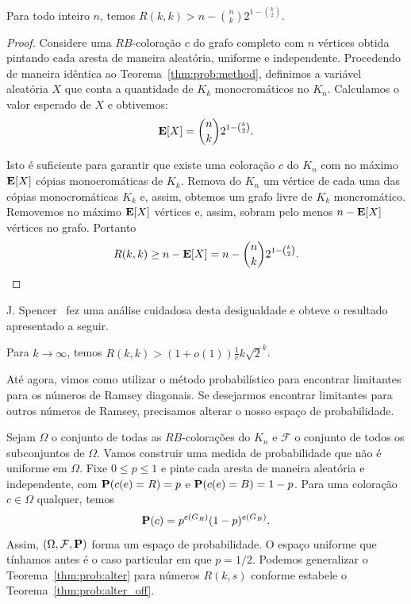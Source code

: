 \begin{theorem}
\label{thm:prob:alter}
Para todo inteiro $n$, temos $\displaystyle R(k,k) > n - \binom{n}{k}2^{1 - \binom{k}{2}}$.
\end{theorem}
\begin{proof}
Considere uma $RB$-coloração $c$ do grafo completo com $n$ vértices obtida pintando cada aresta de maneira aleatória, uniforme e independente. Procedendo de maneira idêntica ao Teorema~\ref{thm:prob:method}, definimos a variável aleatória $X$ que conta a quantidade de $K_k$ monocromáticos no $K_n$. Calculamos o valor esperado de $X$ e obtivemos:
\[ \operatorname{\mathbf{E}}[X] = \binom{n}{k} 2^{1 - \binom{k}{2}}. \]

Isto é suficiente para garantir que existe uma coloração $c$ do $K_n$ com no máximo $\operatorname{\mathbf{E}}[X]$ cópias monocromáticas de $K_k$. Remova do $K_n$ um vértice de cada uma das cópias monocromáticas $K_k$ e, assim, obtemos um grafo livre de $K_k$ moncromático. Removemos no máximo $\operatorname{\mathbf{E}}[X]$ vértices e, assim, sobram pelo menos $n - \operatorname{\mathbf{E}}[X]$ vértices no grafo. Portanto
\[ R(k,k) \geq n - \operatorname{\mathbf{E}}[X] = n - \binom{n}{k} 2^{1 - \binom{k}{2}}.  \qedhere\]
\end{proof}

J. Spencer~\cite{spencer2014asymptopia} fez uma análise cuidadosa desta desigualdade e obteve o resultado apresentado a seguir.

\begin{noproofcorollary}
Para $k \to \infty$, temos $\displaystyle R(k,k) > (1+o(1))\frac{1}{e}k\sqrt{2}^k$.
\end{noproofcorollary}

Até agora, vimos como utilizar o método probabilístico para encontrar limitantes para os números de Ramsey diagonais. Se desejarmos encontrar limitantes para outros números de Ramsey, precisamos alterar o nosso espaço de probabilidade.

Sejam $\Omega$ o conjunto de todas as $RB$-colorações do $K_n$ e $\mathcal{F}$ o conjunto de todos os subconjuntos de $\Omega$. Vamos construir uma medida de probabilidade que não é uniforme em $\Omega$. Fixe $0 \leq p \leq 1$ e pinte cada aresta de maneira aleatória e independente, com $\operatorname{\mathbf{P}}(c(e) = R) = p$ e $\operatorname{\mathbf{P}}(c(e) = B) = 1 - p$. Para uma coloração $c \in \Omega$ qualquer, temos
\[ \operatorname{\mathbf{P}}(c) =  p^{e(G_R)}(1-p)^{e(G_B)}.\]
Assim, $(\Omega, \mathcal{F}, \operatorname{\mathbf{P}})$ forma um espaço de probabilidade. O espaço uniforme que tínhamos antes é o caso particular em que $p = 1/2$. Podemos generalizar o Teorema~\ref{thm:prob:alter} para números $R(k,s)$ conforme estabele o Teorema~\ref{thm:prob:alter_off}.

